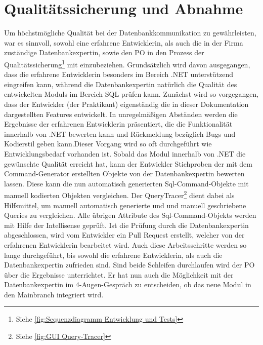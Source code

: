 \documentclass[11pt,toc=sectionentrywithoutdots, 
headheight=44pt, headings=optiontoheadandtoc, hyperfootnotes=false, hypertexnames=false]{scrartcl}
\newcommand\extendedref[1]{Siehe \ref{#1}}
\begin{document}

\section{Qualitätssicherung und Abnahme}
Um höchstmögliche Qualität bei der Datenbankkommunikation zu gewährleisten, war es sinnvoll, sowohl eine erfahrene Entwicklerin, als auch die in der Firma zuständige Datenbankexpertin, sowie den \gls{PO} in den Prozess der Qualitätssicherung\footnote{\extendedref{fig:Sequenzdiagramm Entwicklung und Tests}} mit einzubeziehen. Grundsätzlich wird davon ausgegangen, dass die erfahrene Entwicklerin besonders im Bereich .NET unterstützend eingreifen kann, während die Datenbankexpertin natürlich die Qualität des entwickelten Moduls im Bereich SQL prüfen kann. Zunächst wird so vorgegangen, dass der Entwickler (der Praktikant) eigenständig die in dieser Dokumentation dargestellten Features entwickelt. In unregelmäßigen Abständen werden die Ergebnisse der erfahrenen Entwicklerin präsentiert, die die Funktionalität innerhalb von .NET bewerten kann und Rückmeldung bezüglich Bugs und Kodierstil geben kann.\newline\newline Dieser Vorgang wird so oft durchgeführt wie Entwicklungsbedarf vorhanden ist. Sobald das Modul innerhalb von .NET die gewünschte Qualität erreicht hat, kann der Entwickler Stichproben der mit dem Command-Generator erstellten Objekte von der Datenbankexpertin bewerten lassen. Diese kann die nun automatisch generierten Sql-Command-Objekte mit manuell kodierten Objekten vergleichen. Der QueryTracer\footnote{\extendedref{fig:GUI Query-Tracer}} dient dabei als Hilfsmittel, um manuell automatisch generierte und und manuell geschriebene Queries zu vergleichen. Alle übrigen Attribute des Sql-Command-Objekts werden mit Hilfe der \gls{Intellisense} geprüft. Ist die Prüfung durch die Datenbankexpertin abgeschlossen, wird vom Entwickler ein \gls{Pull Request} erstellt, welcher von der erfahrenen Entwicklerin bearbeitet wird. Auch diese Arbeitsschritte werden so lange durchgeführt, bis sowohl die erfahrene Entwicklerin, als auch die Datenbankexpertin zufrieden sind. Sind beide Schleifen durchlaufen wird der PO über die Ergebnisse unterrichtet. Er hat nun auch die Möglichkeit mit der Datenbankexpertin im 4-Augen-Gespräch zu entscheiden, ob das neue Modul in den Mainbranch integriert wird.
\end{document}
